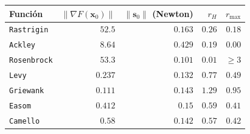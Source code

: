 \begin{tabular}{l r r r r}
\toprule
\rowcolor{Azul1!50}
Función & $\|\nabla F(\mathbf{x}_0)\|$ & $\|\mathbf{s}_0\|$ (Newton) & $r_H$ & $r_{\max}$ \\
\midrule
\texttt{Rastrigin} & $52.5$ & $0.163$ & $0.26$ & $0.18$ \\
\texttt{Ackley} & $8.64$ & $0.429$ & $0.19$ & $0.00$ \\
\texttt{Rosenbrock} & $53.3$ & $0.101$ & $0.01$ & $\ge3$ \\
\texttt{Levy} & $0.237$ & $0.132$ & $0.77$ & $0.49$ \\
\texttt{Griewank} & $0.111$ & $0.143$ & $1.29$ & $0.95$ \\
\texttt{Easom} & $0.412$ & $0.15$ & $0.59$ & $0.41$ \\
\texttt{Camello} & $0.58$ & $0.142$ & $0.57$ & $0.42$ \\
\bottomrule
\end{tabular}
